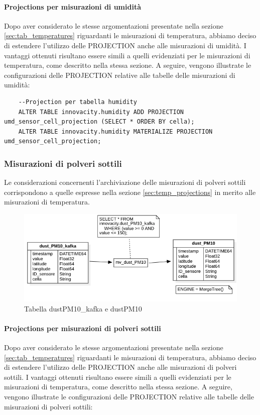 \paragraph{Projections per misurazioni di umidità} 
Dopo aver considerato le stesse argomentazioni presentate nella sezione \ref{sec:tab_temperatures} riguardanti le misurazioni di temperatura, abbiamo deciso di estendere l'utilizzo delle PROJECTION anche alle misurazioni di umidità. I vantaggi ottenuti risultano essere simili a quelli evidenziati per le misurazioni di temperatura, come descritto nella stessa sezione. A seguire, vengono illustrate le configurazioni delle PROJECTION relative alle tabelle delle misurazioni di umidità:

\begin{lstlisting}
    --Projection per tabella humidity
    ALTER TABLE innovacity.humidity ADD PROJECTION umd_sensor_cell_projection (SELECT * ORDER BY cella);
    ALTER TABLE innovacity.humidity MATERIALIZE PROJECTION umd_sensor_cell_projection;
\end{lstlisting}


\subsubsection{Misurazioni di polveri sottili}Le considerazioni concernenti l'archiviazione delle misurazioni di polveri sottili corrispondono a quelle espresse nella sezione \ref{sec:temp_projections} in merito alle misurazioni di temperatura.

\begin{figure}[H]
    \centering
    \includegraphics[width=1\textwidth]{../Images/SpecificaTecnica/dust_PM10.png}
    \caption{Tabella dustPM10\_kafka e dustPM10}
    \label{fig:umidities}
  \end{figure}

\paragraph{Projections per misurazioni di polveri sottili} 
Dopo aver considerato le stesse argomentazioni presentate nella sezione \ref{sec:tab_temperatures} riguardanti le misurazioni di temperatura, abbiamo deciso di estendere l'utilizzo delle PROJECTION anche alle misurazioni di polveri sottili. I vantaggi ottenuti risultano essere simili a quelli evidenziati per le misurazioni di temperatura, come descritto nella stessa sezione. A seguire, vengono illustrate le configurazioni delle PROJECTION relative alle tabelle delle misurazioni di polveri sottili:

